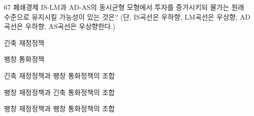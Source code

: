 \begin{question}{67}
폐쇄경제 IS-LM과 AD-AS의 동시균형 모형에서 투자를 증가시키되 물가는 원래 수준으로 유지시킬 가능성이 있는 것은? (단, IS곡선은 우하향, LM곡선은 우상향, AD곡선은 우하향, AS곡선은 우상향한다.)
\begin{choices}
  \item 긴축 재정정책
  \item 팽창 통화정책
  \item 긴축 재정정책과 팽창 통화정책의 조합
  \item 팽창 재정정책과 긴축 통화정책의 조합
  \item 팽창 재정정책과 팽창 통화정책의 조합
\end{choices}
\end{question}
